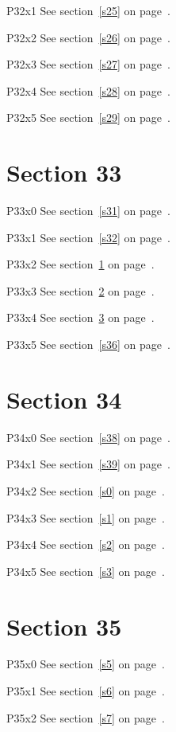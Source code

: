P32x1 \w\w\w\w\w\w See section~\ref{s25} on page~\pageref{s17}.

P32x2 \w\w\w\w\w\w See section~\ref{s26} on page~\pageref{s18}.

P32x3 \w\w\w\w\w\w See section~\ref{s27} on page~\pageref{s19}.

P32x4 \w\w\w\w\w\w See section~\ref{s28} on page~\pageref{s20}.

P32x5 \w\w\w\w\w\w See section~\ref{s29} on page~\pageref{s21}.

\section{Section 33}\label{s33}
P33x0 \w\w\w\w\w\w See section~\ref{s31} on page~\pageref{s19}.

P33x1 \w\w\w\w\w\w See section~\ref{s32} on page~\pageref{s20}.

P33x2 \w\w\w\w\w\w See section~\ref{s33} on page~\pageref{s21}.

P33x3 \w\w\w\w\w\w See section~\ref{s34} on page~\pageref{s22}.

P33x4 \w\w\w\w\w\w See section~\ref{s35} on page~\pageref{s23}.

P33x5 \w\w\w\w\w\w See section~\ref{s36} on page~\pageref{s24}.

\section{Section 34}\label{s34}
P34x0 \w\w\w\w\w\w See section~\ref{s38} on page~\pageref{s22}.

P34x1 \w\w\w\w\w\w See section~\ref{s39} on page~\pageref{s23}.

P34x2 \w\w\w\w\w\w See section~\ref{s0} on page~\pageref{s24}.

P34x3 \w\w\w\w\w\w See section~\ref{s1} on page~\pageref{s25}.

P34x4 \w\w\w\w\w\w See section~\ref{s2} on page~\pageref{s26}.

P34x5 \w\w\w\w\w\w See section~\ref{s3} on page~\pageref{s27}.

\section{Section 35}\label{s35}
P35x0 \w\w\w\w\w\w See section~\ref{s5} on page~\pageref{s25}.

P35x1 \w\w\w\w\w\w See section~\ref{s6} on page~\pageref{s26}.

P35x2 \w\w\w\w\w\w See section~\ref{s7} on page~\pageref{s27}.

